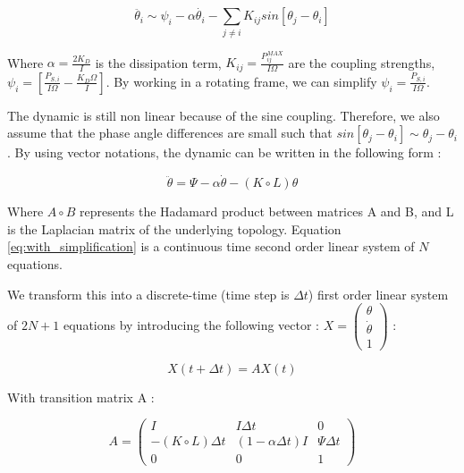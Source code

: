 \documentclass[conference]{IEEEtran}
\begin{document}
\begin{equation}
 \ddot{ \theta_i } \sim \psi_i - \alpha \dot{ \theta_i } - \sum_{j\neq i} K_{ij} sin \left[ \theta_j - \theta_i \right] 
\end{equation}

Where $ \alpha = \frac{2 K_D}{I} $ is the dissipation term, $ K_{ij} = \frac{P_{ij}^{MAX}}{I \Omega} $ are the coupling strengths, $ \psi_i = \left[ \frac{P_{S,i}}{I \Omega} - \frac{K_D \Omega}{I} \right] $. By working in a rotating frame, we can simplify $ \psi_i=\frac{P_{S,i}}{I \Omega} $.

The dynamic is still non linear because of the sine coupling. Therefore, we also assume that the phase angle differences are small such that $ sin \left[ \theta_j - \theta_i \right] \sim \theta_j - \theta_i $. By using vector notations, the dynamic can be written in the following form :

\begin{equation}
\label{eq:with_simplification}
\ddot{\theta} = \Psi - \alpha \dot{\theta} - (K \circ L)\theta
\end{equation}

Where $ A \circ B $ represents the Hadamard product between matrices A and B, and L is the Laplacian matrix of the underlying topology. Equation \ref{eq:with_simplification} is a continuous time second order linear system of $ N $ equations. 

We transform this into a discrete-time (time step is $\Delta t$) first order linear system of $ 2 N + 1 $ equations by introducing the following vector : $ X = \left( \begin{array}{c} \theta \\ \dot{\theta} \\ 1 \end{array} \right)$ : 

\begin{equation}
\label{eq:final_equation}
 X(t+\Delta t) = A X(t)
\end{equation}

With transition matrix A :

\begin{equation}
 A =   \left( \begin{array}{ccc} I & I \Delta t & 0 \\ -(K \circ L) \Delta t & (1-\alpha \Delta t)I & \Psi \Delta t \\ 0&0&1 \end{array} \right)
\end{equation}
\end{document}
